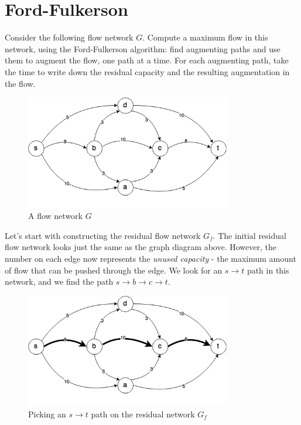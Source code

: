 \documentclass{article}
\begin{document}
\section{Ford-Fulkerson}
Consider the following flow network $G$.
Compute a maximum flow in this network, using the Ford-Fulkerson
algorithm: find augmenting paths and use them to augment the flow,
one path at a time. For each augmenting path, take the time to write
down the residual capacity and the resulting augmentation in the
flow.

\begin{figure}[H]
\centering
\includegraphics[width=0.8\textwidth]{g_0.png}
\caption{A flow network $G$}
\end{figure}

Let's start with constructing the residual flow network $G_f$.
The initial residual flow network looks just the same as the graph diagram
above. However, the number on each edge now represents the {\it unused
capacity} - the maximum amount of flow that can be pushed through the edge.
We look for an $s \rightarrow t$ path in this network, and
we find the path $s \rightarrow b \rightarrow c \rightarrow t$.

\begin{figure}[H]
\centering
\includegraphics[width=0.8\textwidth]{gf_0.png}
\caption{Picking an $s \rightarrow t$ path on the residual network $G_f$}
\end{figure}
\end{document}
